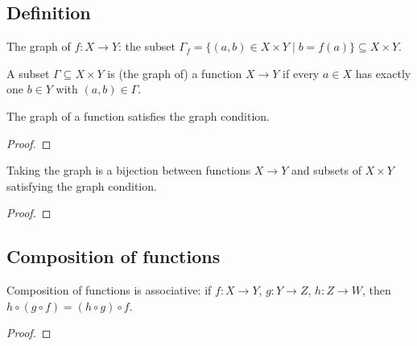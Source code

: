 \subsection{Definition}
\label{subsec:prelims:functions:definition}

\begin{definition}
  \label{def:prelims:graph-of}
  \leanok
  The graph of $f : X \to Y$: the subset
  $\Gamma_f = \{(a,b) \in X \times Y \mid b = f(a)\} \subseteq X \times Y$.
\end{definition}

\begin{definition}
  \label{def:prelims:is-graph}
  \leanok
  A subset $\Gamma \subseteq X \times Y$ is (the graph of) a function
  $X \to Y$ if every $a \in X$ has exactly one $b \in Y$ with
  $(a,b) \in \Gamma$.
\end{definition}

\begin{proposition}
  \label{prop:prelims:is-graph-graph-of}
  \leanok
  The graph of a function satisfies the graph condition.
\end{proposition}
\begin{proof}
  \leanok
\end{proof}

\begin{proposition}
  \label{prop:prelims:bijective-graph-of}
  \leanok
  Taking the graph is a bijection between functions $X \to Y$ and
  subsets of $X \times Y$ satisfying the graph condition.
\end{proposition}
\begin{proof}
  \leanok
\end{proof}

\subsection{Composition of functions}
\label{subsec:prelims:composition-of-functions}

\begin{proposition}
  \label{prop:prelims:comp-assoc}
  \leanok
  Composition of functions is associative: if $f : X \to Y$,
  $g : Y \to Z$, $h : Z \to W$, then
  $h \circ (g \circ f) = (h \circ g) \circ f$.
\end{proposition}
\begin{proof}
  \leanok
\end{proof}

